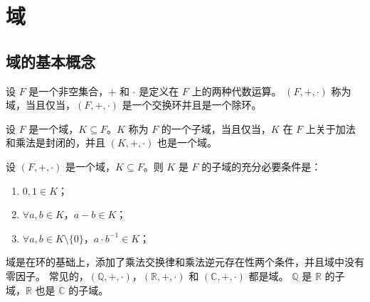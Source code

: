 \section{域}

\subsection{域的基本概念}
\begin{definition}[域 Field]
    设 $F$ 是一个非空集合，$+$ 和 $\cdot$ 是定义在 $F$ 上的两种代数运算。
    $ (F,+,\cdot) $ 称为域，当且仅当，$(F,+,\cdot)$ 是一个交换环并且是一个除环。
    \label{def:field}
\end{definition}

\begin{definition}[子域 Subfield]
    设 $F$ 是一个域，$K \subseteq F$。$K$ 称为 $F$ 的一个子域，当且仅当，$K$ 在 $F$ 上关于加法和乘法是封闭的，并且 $(K,+,\cdot)$ 也是一个域。
    \label{def:subfield}
\end{definition}

\begin{theorem}[子域判定定理]
    设 $(F,+,\cdot)$ 是一个域，$K \subseteq F$。则 $K$ 是 $F$ 的子域的充分必要条件是：
    \begin{enumerate}
        \item $0,1\in K$；
        \item $\forall a,b\in K$，$a-b\in K$；
        \item $\forall a,b\in K\setminus\{0\}$，$a\cdot b^{-1} \in K$；
    \end{enumerate}
\end{theorem}

\begin{note}
    域是在环的基础上，添加了乘法交换律和乘法逆元存在性两个条件，并且域中没有零因子。
    常见的，$(\mathbb{Q},+,\cdot)$，$(\mathbb{R},+,\cdot)$ 和 $(\mathbb{C},+,\cdot)$ 都是域。
    $\mathbb{Q}$ 是 $\mathbb{R}$ 的子域，$\mathbb{R}$ 也是 $\mathbb{C}$ 的子域。
\end{note}



